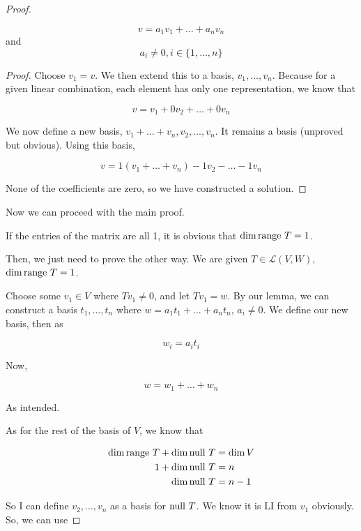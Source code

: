 \begin{enumerate}
\begin{proof}
\begin{lemma*}
            $$v = a_1v_1 + \dots + a_nv_n$$
            and
            $$a_i \neq 0, i \in \{1, \dots, n\}$$


        \end{lemma*}

        \begin{proof}
            Choose $v_1 = v$. We then extend this to a basis, $v_1, \dots, v_n$. Because for a given linear combination, each element has only one representation, we know that 

            $$v = v_1 + 0v_2 + \dots + 0v_n$$

            We now define a new basis, $v_1 + \dots + v_n, v_2, \dots, v_n$. It remains a basis (unproved but obvious). Using this basis, 

            $$v = 1(v_1 + \dots + v_n) - 1v_2 - \dots - 1v_n$$

            None of the coefficients are zero, so we have constructed a solution.
        \end{proof}

        Now we can proceed with the main proof.

        If the entries of the matrix are all 1, it is obvious that $\dim \text{range } T = 1$. 

        Then, we just need to prove the other way. We are given $T \in \mathcal L(V, W)$, $\dim \text{range } T = 1$. 

        Choose some $v_1 \in V$ where $Tv_1 \neq 0$, and let $Tv_1 = w$. By our lemma, we can construct a basis $t_1, \dots, t_n$ where $w = a_1t_1 + \dots + a_nt_n$, $a_i \neq 0$. We define our new basis, then as 

        $$w_i = a_it_i$$

        Now, 

        $$w = w_1 + \dots + w_n$$

        As intended. 

        As for the rest of the basis of $V$, we know that 

        \begin{align*}
            \dim \text{range } T + \dim \text{null } T &= \dim V \\
            1 + \dim\text{null } T &= n \\
            \dim\text{null } T &= n - 1
        \end{align*}

        So I can define $v_2, \dots, v_n$ as a basis for $\text{null } T$. We know it is LI from $v_1$ obviously. So, we can use 


\end{proof}
\end{enumerate}

